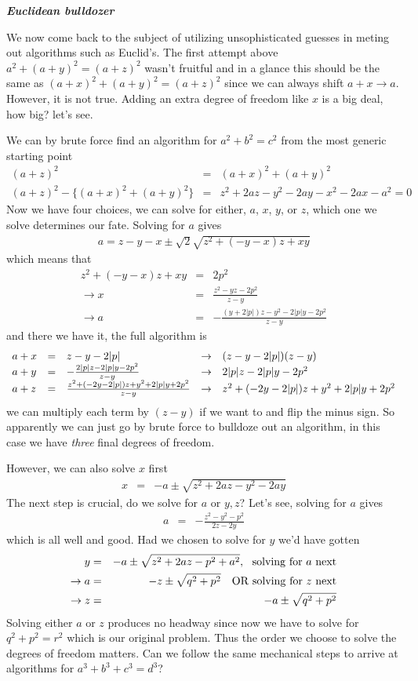 \documentclass[aps,preprint,preprintnumbers,nofootinbib,showpacs,prd]{revtex4-1}
\newcommand{\nbea}{\begin{eqnarray*}}
\newcommand{\neea}{\end{eqnarray*}}
\begin{document}
\bigskip\textbf{\textit{Euclidean bulldozer}}

We now come back to the subject of utilizing unsophisticated guesses in meting out algorithms such as Euclid's. The first attempt above $a^2 + (a+y)^2 = (a+z)^2$ wasn't fruitful and in a glance this should be the same as $(a+x)^2 + (a+y)^2 = (a+z)^2$ since we can always shift $a+x \rightarrow a$. However, it is not true. Adding an extra degree of freedom like $x$ is a big deal, how big? let's see.

We can by brute force find an algorithm for $a^2 + b^2 = c^2$ from the most generic starting point
%
\nbea
(a+z)^2 & = & (a+x)^2 + (a+y)^2 \\
(a+z)^2 - \{(a+x)^2 + (a+y)^2\} & = & z^2+2az-y^2-2ay-x^2-2ax-a^2 = 0
\neea
%
Now we have four choices, we can solve for either, $a$, $x$, $y$, or $z$, which one we solve determines our fate. Solving for $a$ gives
%
\nbea
a = z-y-x \pm \sqrt{2}\sqrt{z^2+(-y-x)z+xy}
\neea
%
which means that
%
\nbea
z^2+(-y-x)z+xy & = & 2 p^2 \\
\rightarrow x & = & \frac{z^2-yz-2p^2}{z-y} \\
\rightarrow a & = & -\frac{(y+2|p|)z-y^2-2|p|y-2p^2}{z-y}
\neea
%
and there we have it, the full algorithm is
%
\nbea
\begin{array} {l c l c l}
a + x & = & z-y-2|p| & \rightarrow & (z-y-2|p|)(z-y) \\
a + y & = & -\frac{2|p|z-2|p|y-2p^2}{z-y}  & \rightarrow & 2|p|z-2|p|y-2p^2 \\
a + z & = & \frac{z^2+(-2y-2|p|)z+y^2+2|p|y+2p^2}{z-y}  & \rightarrow & z^2+(-2y-2|p|)z+y^2+2|p|y+2p^2
\end{array}
\neea
%
we can multiply each term by $(z-y)$ if we want to and flip the minus sign. So apparently we can just go by brute force to bulldoze out an algorithm, in this case we have {\it three} final degrees of freedom.

However, we can also solve $x$ first
%
\nbea
x & = & -a \pm \sqrt{z^2+2az-y^2-2ay}
\neea
%
The next step is crucial, do we solve for $a$ or $y,z$? Let's see, solving for $a$ gives
%
\nbea
a & = & -\frac{z^2-y^2-p^2}{2z-2y}
\neea
%
which is all well and good. Had we chosen to solve for $y$ we'd have gotten
%
\nbea
y & = & -a \pm \sqrt{z^2+2az-p^2+a^2}, ~~{\rm solving~for~}a~{\rm next} \\
\rightarrow a & = & -z \pm \sqrt{q^2+p^2} ~~~{\rm OR~solving~for~}z~{\rm next}\\
\rightarrow z & = & -a \pm \sqrt{q^2+p^2}
\neea
%
Solving either $a$ or $z$ produces no headway since now we have to solve for $q^2+p^2 = r^2$ which is our original problem. Thus the order we choose to solve the degrees of freedom matters. Can we follow the same mechanical steps to arrive at algorithms for $a^3 + b^3 + c^3 = d^3$?
\end{document}

